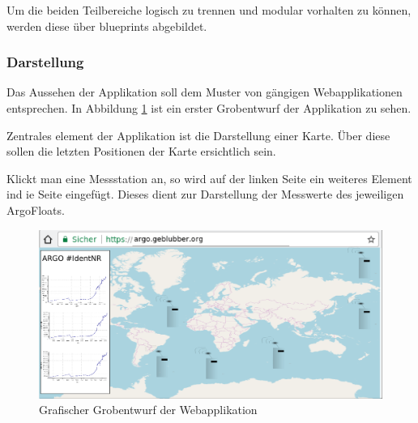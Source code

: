 Um die beiden Teilbereiche logisch zu trennen und modular vorhalten zu können, werden diese über blueprints abgebildet.



\subsubsection{Darstellung}
%
%

Das Aussehen der Applikation soll dem Muster von gängigen Webapplikationen entsprechen. In Abbildung \ref{fig:entwurf_webseite} ist ein erster Grobentwurf der Applikation zu sehen.

Zentrales element der Applikation ist die Darstellung einer Karte. Über diese sollen die letzten Positionen der Karte ersichtlich sein.


Klickt man eine Messstation an, so wird auf der linken Seite ein weiteres Element ind ie Seite eingefügt. Dieses dient zur Darstellung der Messwerte des jeweiligen ArgoFloats.



\begin{figure}[h!]
    \centering
    \includegraphics[width=\textwidth]{pix/EntwurfWebseite.png}
    \caption{Grafischer Grobentwurf der Webapplikation}
    \label{fig:entwurf_webseite}
\end{figure}

